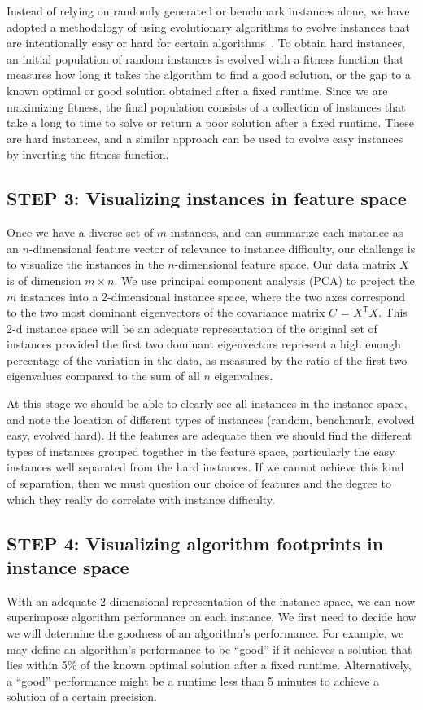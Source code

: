 \documentclass[conference]{IEEEtran}
\begin{document}
Instead of relying on randomly generated or benchmark instances alone, we have adopted a methodology of using evolutionary algorithms to evolve instances that are intentionally easy or hard for certain algorithms~\cite{AMAI}. To obtain hard instances, an initial population of random instances is evolved with a fitness function that measures how long it takes the algorithm to find a good solution, or the gap to a known optimal or good solution obtained after a fixed runtime. Since we are maximizing fitness, the final population consists of a collection of instances that take a long to time to solve or return a poor solution after a fixed runtime. These are hard instances, and a similar approach can be used to evolve easy instances by inverting the fitness function.

\subsection{STEP 3: Visualizing instances in feature space}
Once we have a diverse set of $m$ instances, and can summarize each instance as an $n$-dimensional feature vector of relevance to instance difficulty, our challenge is to visualize the instances in the $n$-dimensional feature space. Our data matrix $X$ is of dimension $m \times n$. We use principal component analysis (PCA) to project the $m$ instances into a 2-dimensional instance space, where the two axes correspond to the two most dominant eigenvectors of the covariance matrix $C$ = $X^\mathsf{T}\!X$. This 2-d instance space will be an adequate representation of the original set of instances provided the first two dominant eigenvectors represent a high enough percentage of the variation in the data, as measured by the ratio of the first two eigenvalues compared to the sum of all $n$ eigenvalues.

At this stage we should be able to clearly see all instances in the instance space, and note the location of different types of instances (random, benchmark, evolved easy, evolved hard). If the features are adequate then we should find the different types of instances grouped together in the feature space, particularly the easy instances well separated from the hard instances. If we cannot achieve this kind of separation, then we must question our choice of features and the degree to which they really do correlate with instance difficulty.

\subsection{STEP 4: Visualizing algorithm footprints in instance space}
With an adequate 2-dimensional representation of the instance space, we can now superimpose algorithm performance on each instance. We first need to decide how we will determine the goodness of an algorithm's performance. For example, we may define an algorithm's performance to be “good” if it achieves a solution that lies within 5\% of the known optimal solution after a fixed runtime. Alternatively, a ``good'' performance might be a runtime less than 5 minutes to achieve a solution of a certain precision.
\end{document}
